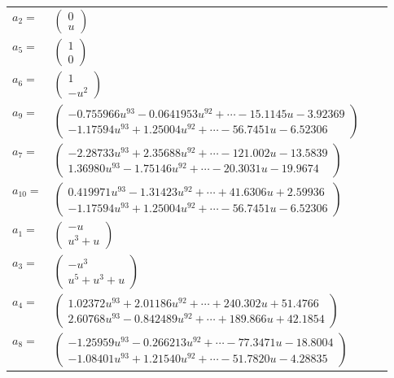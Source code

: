 \documentclass[1p]{elsarticle_modified}
\theoremstyle{definition}
\begin{document}
\begin{tabular}{m{7pt} m{180pt} m{7pt} m{180pt} }
\flushright $a_{2}=$&$\begin{pmatrix}0\\u\end{pmatrix}$ \\
\flushright $a_{5}=$&$\begin{pmatrix}1\\0\end{pmatrix}$ \\
\flushright $a_{6}=$&$\begin{pmatrix}1\\- u^2\end{pmatrix}$ \\
\flushright $a_{9}=$&$\begin{pmatrix}-0.755966 u^{93}-0.0641953 u^{92}+\cdots-15.1145 u-3.92369\\-1.17594 u^{93}+1.25004 u^{92}+\cdots-56.7451 u-6.52306\end{pmatrix}$ \\
\flushright $a_{7}=$&$\begin{pmatrix}-2.28733 u^{93}+2.35688 u^{92}+\cdots-121.002 u-13.5839\\1.36980 u^{93}-1.75146 u^{92}+\cdots-20.3031 u-19.9674\end{pmatrix}$ \\
\flushright $a_{10}=$&$\begin{pmatrix}0.419971 u^{93}-1.31423 u^{92}+\cdots+41.6306 u+2.59936\\-1.17594 u^{93}+1.25004 u^{92}+\cdots-56.7451 u-6.52306\end{pmatrix}$ \\
\flushright $a_{1}=$&$\begin{pmatrix}- u\\u^3+u\end{pmatrix}$ \\
\flushright $a_{3}=$&$\begin{pmatrix}- u^3\\u^5+u^3+u\end{pmatrix}$ \\
\flushright $a_{4}=$&$\begin{pmatrix}1.02372 u^{93}+2.01186 u^{92}+\cdots+240.302 u+51.4766\\2.60768 u^{93}-0.842489 u^{92}+\cdots+189.866 u+42.1854\end{pmatrix}$ \\
\flushright $a_{8}=$&$\begin{pmatrix}-1.25959 u^{93}-0.266213 u^{92}+\cdots-77.3471 u-18.8004\\-1.08401 u^{93}+1.21540 u^{92}+\cdots-51.7820 u-4.28835\end{pmatrix}$ \\

\end{tabular}
\end{document}
